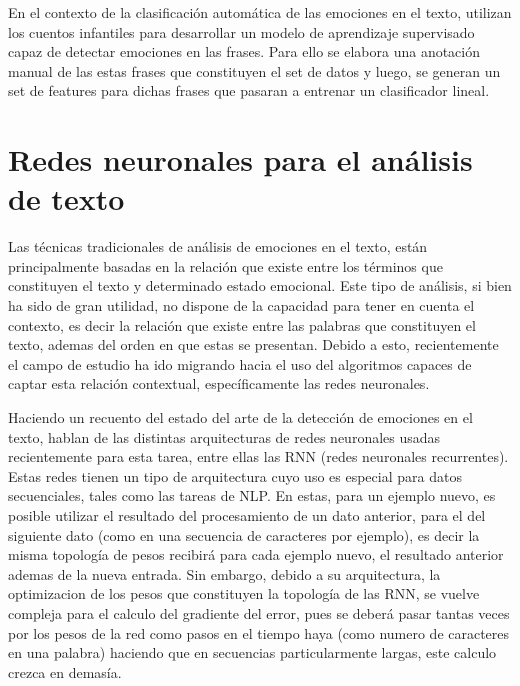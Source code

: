 En el contexto de la clasificación automática de las emociones en el texto, \cite{alm2005emotions} utilizan los cuentos infantiles para desarrollar un modelo de aprendizaje supervisado capaz de detectar emociones en las frases. Para ello se elabora una anotación manual de las estas frases que constituyen el set de datos y luego, se generan un set de features para dichas frases que pasaran a entrenar un clasificador lineal.




\section{Redes neuronales para el análisis de texto}

Las técnicas tradicionales de análisis de emociones en el texto, están principalmente basadas en la relación que existe entre los términos que constituyen el texto y determinado estado emocional. Este tipo de análisis, si bien ha sido de gran utilidad, no dispone de la capacidad para tener en cuenta el contexto, es decir la relación que existe entre las palabras que constituyen el texto, ademas del orden en que estas se presentan. Debido a esto, recientemente el campo de estudio ha ido migrando hacia el uso del algoritmos capaces de captar esta relación contextual, específicamente las redes neuronales. 

Haciendo un recuento del estado del arte de la detección de emociones en el texto, \cite{acheampong2021transformer}  hablan de las distintas arquitecturas de redes neuronales usadas recientemente para esta tarea, entre ellas las RNN (redes neuronales recurrentes). Estas redes tienen un tipo de arquitectura cuyo uso es especial para datos secuenciales, tales como las tareas de NLP. En estas, para un ejemplo nuevo, es posible utilizar el resultado del procesamiento de un dato anterior, para el del siguiente dato (como en una secuencia de caracteres por ejemplo), es decir la misma topología de pesos recibirá para cada ejemplo nuevo, el resultado anterior ademas de la nueva entrada. Sin embargo, debido a su arquitectura, la optimizacion de los pesos que constituyen la topología de las RNN, se vuelve compleja para el calculo del gradiente del error, pues se deberá pasar tantas veces por los pesos de la red como pasos en el tiempo haya (como numero de caracteres en una palabra) haciendo que en secuencias particularmente largas, este calculo crezca en demasía.


